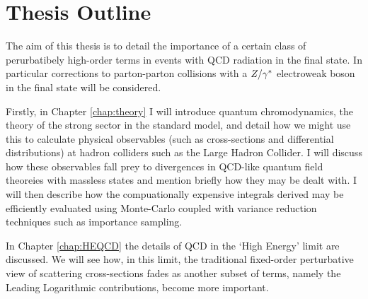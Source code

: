 \section{Thesis Outline}
\label{sec:outline}

	The aim of this thesis is to detail the importance of a certain class of perurbatibely high-order terms in events with QCD radiation in the final state.  In particular
	corrections to parton-parton collisions with a ${Z/\gamma^*}$ electroweak boson in the final state will be considered.

	Firstly, in Chapter \ref{chap:theory} I will introduce quantum chromodynamics, the theory of the strong sector in the standard model, and detail how we might use this
	to calculate physical observables (such as cross-sections and differential distributions) at hadron colliders such as the Large Hadron Collider.  I will discuss how
	these observables fall prey to divergences in QCD-like quantum field theoreies with massless states and mention briefly how they may be dealt with.  I will then
	describe how the compuationally expensive integrals derived may be efficiently evaluated using Monte-Carlo coupled with variance reduction techniques such as
	importance sampling.

	In Chapter \ref{chap:HEQCD} the details of QCD in the `High Energy' limit are discussed.  We will see how, in this limit, the traditional fixed-order perturbative
	view of scattering cross-sections fades as another subset of terms, namely the Leading Logarithmic contributions, become more important.
